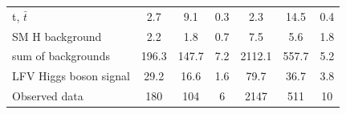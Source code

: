 \documentclass[oneside, letterpaper, oldfontcommands]{memoir}
\begin{document}
\begin{table}[hbtp]
\begin{tabular}{lccc|ccc}
    t, $\bar{t}$                             &  2.7   &  9.1      &  0.3 &2.3 & 14.5 & 0.4    \\
    SM H background                        &  2.2   &  1.8      &  0.7 &7.5 & 5.6 & 1.8    \\ \hline
    sum of backgrounds                       & 196.3   & 147.7      & 7.2 &2112.1& 557.7 & 5.2  \\  \hline
    LFV Higgs boson signal                   &  29.2   &  16.6      &  1.6 &79.7 & 36.7 & 3.8    \\ \hline \hline
      Observed data                          &  180   &  104      &  6  & 2147 & 511 & 10 \\ \hline
  \end{tabular}
\end{table}
\end{document}

